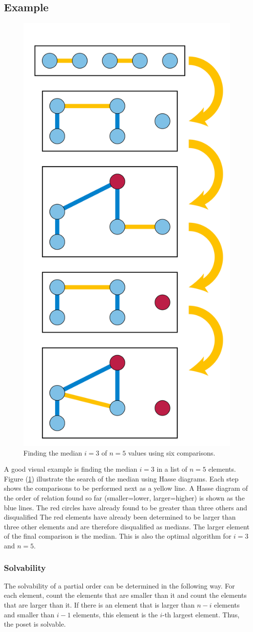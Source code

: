 \documentclass[10pt,journal,compsoc]{IEEEtran}
\begin{document}
\subsection{Example}
\begin{figure}[h!]
  \centering
  \includegraphics[width=0.5\columnwidth]{figures/Median_of_5.svg.png}
  \caption{Finding the median $i=3$ of $n=5$ values using six comparisons.}
  \label{fig:median_of_5}
\end{figure}
A good visual example is finding the median $i=3$ in a list of $n=5$ elements. Figure
(\ref{fig:median_of_5}) illustrate the search of the median using Hasse diagrams. Each step shows
the comparisons to be performed next as a yellow line. A Hasse diagram of the order of relation
found so far (smaller=lower, larger=higher) is shown as the blue lines. The red circles have already
found to be greater than three others and disqualified The red elements have already been determined
to be larger than three other elements and are therefore disqualified as medians. The larger
element of the final comparison is the median. This is also the optimal algorithm for $i=3$ and
$n=5$.


\subsubsection{Solvability}
The solvability of a partial order can be determined in the following way. For each element, count
the elements that are smaller than it and count the elements that are larger than it. If there is an
element that is larger than $n-i$ elements and smaller than $i-1$ elements, this element is the
$i$-th largest element. Thus, the poset is solvable.
\end{document}
